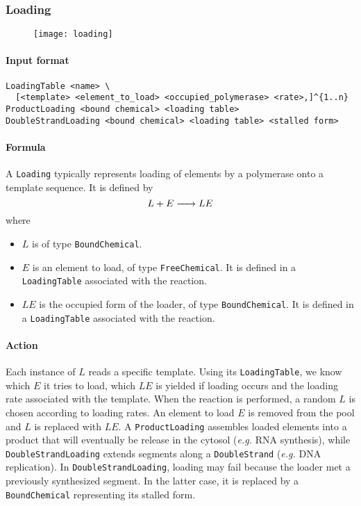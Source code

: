 \subsubsection{Loading}

\begin{figure}[!ht]
	\centering
	\texttt{[image: loading]}
\end{figure}

\paragraph{Input format}
\begin{verbatim}
LoadingTable <name> \
  [<template> <element_to_load> <occupied_polymerase> <rate>,]^{1..n}
ProductLoading <bound chemical> <loading table>
DoubleStrandLoading <bound chemical> <loading table> <stalled form>
\end{verbatim}

\paragraph{Formula} A \texttt{Loading} typically represents loading of elements by a polymerase onto a template sequence. It is defined by
\[
	\reactionIrr{L + E}{LE}{}{}
\]
where
\begin{itemize}
	\item $L$ is of type \texttt{BoundChemical}.
	\item $E$ is an element to load, of type \texttt{FreeChemical}. It is defined in a \texttt{LoadingTable} associated with the reaction.
	\item $LE$ is the occupied form of the loader, of type \texttt{BoundChemical}. It is defined in a \texttt{LoadingTable} associated with the reaction.
\end{itemize}

\paragraph{Action} Each instance of $L$ reads a specific template. Using its \texttt{LoadingTable}, we know which $E$ it tries to load, which $LE$ is yielded if loading occurs and the loading rate associated with the template. When the reaction is performed, a random $L$ is chosen according to loading rates. An element to load $E$ is removed from the pool and $L$ is replaced with $LE$. A \texttt{ProductLoading} assembles loaded elements into a product that will eventually be release in the cytosol (\textit{e.g.} RNA synthesis), while \texttt{DoubleStrandLoading} extends segments along a \texttt{DoubleStrand} (\textit{e.g.} DNA replication). In \texttt{DoubleStrandLoading}, loading may fail because the loader met a previously synthesized segment. In the latter case, it is replaced by a \texttt{BoundChemical} representing its stalled form.


